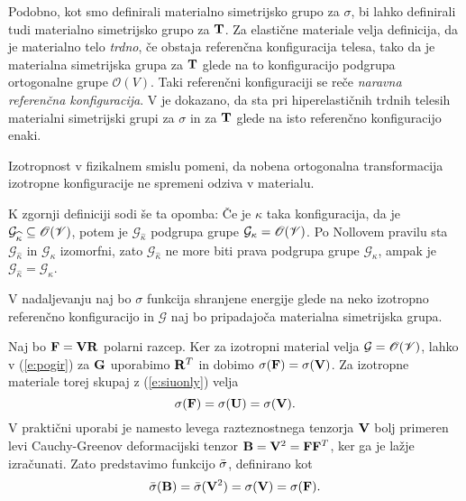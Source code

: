 \begin{opomba}
Podobno, kot smo definirali materialno simetrijsko grupo za $\sigma$, bi lahko
definirali tudi materialno simetrijsko grupo za $\mathbf T$. Za elastične
materiale velja definicija, da je materialno telo \emph{trdno}, če obstaja
referenčna konfiguracija telesa, tako da je materialna simetrijska grupa za $\mathbf T$
glede na to konfiguracijo podgrupa ortogonalne grupe $\mathscr{O}(V)$.
Taki referenčni konfiguraciji se reče \emph{naravna referenčna konfiguracija}. V \cite[str.~310]{truesdell} je dokazano,
da sta pri hiperelastičnih trdnih telesih materialni simetrijski grupi za $\sigma$ in za $\mathbf T$
glede na isto referenčno konfiguracijo enaki.
\end{opomba}

Izotropnost v fizikalnem smislu pomeni, da nobena ortogonalna transformacija izotropne
konfiguracije ne spremeni odziva v materialu.

K zgornji definiciji sodi še ta opomba: Če je $\widehat{\kappa}$ taka konfiguracija, da je
$\mathcal{G}_{\widehat{\kappa}}\subseteq\mathscr{O}(\mathscr V)$, potem je $\mathcal{G}_{\widehat{\kappa}}$
podgrupa grupe $\mathcal{G}_{\kappa}=\mathscr{O}(\mathscr V)$. Po Nollovem pravilu sta
$\mathcal{G}_{\widehat{\kappa}}$ in $\mathcal{G}_{\kappa}$ izomorfni, zato $\mathcal{G}_{\widehat{\kappa}}$
ne more biti prava podgrupa grupe $\mathcal{G}_{\kappa}$, ampak je
$\mathcal{G}_{\widehat{\kappa}}=\mathcal{G}_{\kappa}$.

V nadaljevanju naj bo $\sigma$ funkcija shranjene energije glede na neko izotropno referenčno konfiguracijo
in $\mathcal{G}$ naj bo pripadajoča materialna simetrijska grupa.

Naj bo $\mathbf F=\mathbf V\mathbf R$ polarni razcep. Ker za izotropni material velja $\mathcal{G}=\mathscr{O}(\mathscr V)$,
lahko v (\ref{e:pogir}) za $\mathbf G$ uporabimo $\mathbf R^T$ in dobimo $\sigma(\mathbf F)=\sigma(\mathbf V)$.
Za izotropne materiale torej skupaj z (\ref{e:siuonly}) velja
\[
	\sigma(\mathbf F)=\sigma(\mathbf U)=\sigma(\mathbf V).
\]
V praktični uporabi je namesto levega razteznostnega tenzorja $\mathbf V$ bolj primeren
levi Cauchy-Greenov deformacijski tenzor $\mathbf B=\mathbf V^2=\mathbf F\mathbf F^T$, ker
ga je lažje izračunati. Zato predstavimo funkcijo $\bar{\sigma}$, definirano kot
\begin{equation*} %
	\bar{\sigma}(\ten{B})=\bar{\sigma}(\ten{V}^2)=\sigma(\ten{V})=\sigma(\ten{F}).
\end{equation*}


